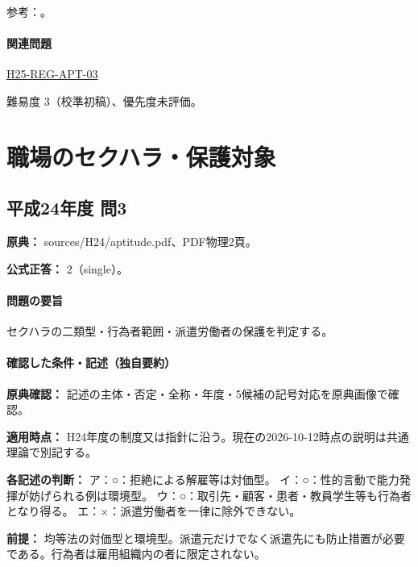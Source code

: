 \par 参考：\cite{employment_power2012,employment_power_current}。

\paragraph{関連問題} \hyperref[q:h25-reg-apt-03]{H25-REG-APT-03}

\par 難易度 3（校準初稿）、優先度未評価。

\section{職場のセクハラ・保護対象}

\subsection{平成24年度 問3}
\label{q:h24-reg-apt-03}

\noindent\textbf{原典：} sources/H24/aptitude.pdf、PDF物理2頁。

\textbf{公式正答：} 2（single）。

\paragraph{問題の要旨} セクハラの二類型・行為者範囲・派遣労働者の保護を判定する。

\paragraph{確認した条件・記述（独自要約）}\mbox{}\par

\noindent\textbf{原典確認：} 記述の主体・否定・全称・年度・5候補の記号対応を原典画像で確認。\par

\noindent\textbf{適用時点：} H24年度の制度又は指針に沿う。現在の2026-10-12時点の説明は共通理論で別記する。\par

\noindent\textbf{各記述の判断：} ア：○：拒絶による解雇等は対価型。 イ：○：性的言動で能力発揮が妨げられる例は環境型。 ウ：○：取引先・顧客・患者・教員学生等も行為者となり得る。 エ：×：派遣労働者を一律に除外できない。\par

\noindent\textbf{前提：} 均等法の対価型と環境型。派遣元だけでなく派遣先にも防止措置が必要である。行為者は雇用組織内の者に限定されない。\par

